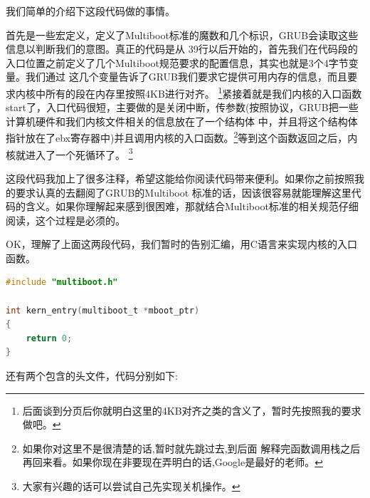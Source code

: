 \par 我们简单的介绍下这段代码做的事情。
\par 首先是一些宏定义，定义了Multiboot标准的魔数和几个标识，GRUB会读取这些信息以判断我们的意图。真正的代码是从\allowbreak
39行以后开始的，首先我们在代码段的入口位置之前定义了几个Multiboot规范要求的配置信息，其实也就是3个4字节变量。我们通过\allowbreak
这几个变量告诉了GRUB我们要求它提供可用内存的信息，而且要求内核中所有的段在内存里按照4KB进行对齐。\allowbreak
\footnote{后面谈到分页后你就明白这里的4KB对齐之类的含义了，暂时先按照我的要求做吧。}紧接着就是我们内核的入口函数\allowbreak
start了，入口代码很短，主要做的是关闭中断，传参数(按照协议，GRUB把一些计算机硬件和我们内核文件相关的信息放在了一个结构体\allowbreak
中，并且将这个结构体指针放在了ebx寄存器中)并且调用内核的入口函数。\footnote{如果你对这里不是很清楚的话,暂时就先跳过去,到后面\allowbreak
解释完函数调用栈之后再回来看。如果你现在非要现在弄明白的话,Google是最好的老师。}等到这个函数返回之后，内核就进入了一个死循环了。\allowbreak
\footnote{大家有兴趣的话可以尝试自己先实现关机操作。}

\par 这段代码我加上了很多注释，希望这能给你阅读代码带来便利。如果你之前按照我的要求认真的去翻阅了GRUB的Multiboot\allowbreak
标准的话，因该很容易就能理解这里代码的含义。如果你理解起来感到很困难，那就结合Multiboot标准的相关规范仔细阅读，这个过程是必须的。

\par OK，理解了上面这两段代码，我们暂时的告别汇编，用C语言来实现内核的入口函数。

\begin{lstlisting}[language = C, label = init/entry.c, caption = init/entry.c]
#include "multiboot.h"

int kern_entry(multiboot_t *mboot_ptr)
{
	return 0;
}
\end{lstlisting} 

\par 还有两个包含的头文件，代码分别如下:

